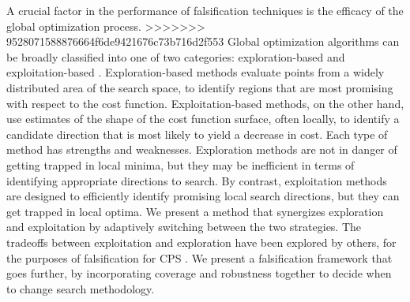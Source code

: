 A crucial factor in the performance of falsification techniques is the efficacy of the global optimization process.
>>>>>>> 9528071588876664f6de9421676c73b716d2f553
Global optimization algorithms can be broadly classified into one of two
categories: exploration-based and exploitation-based \cite{Blum03}.
Exploration-based methods evaluate points from a widely distributed area 
of the search space, to identify regions that are most promising with 
respect to the cost function. Exploitation-based methods, on the other hand, 
use estimates of the shape of the cost function surface, often locally, to
identify a candidate direction that is most likely to yield a decrease
in cost. Each type of method has strengths and weaknesses. Exploration
methods are not in danger of getting trapped in local minima, but they may 
be inefficient in terms of identifying appropriate directions to search.  By
contrast, exploitation methods are designed to efficiently identify
promising local search directions, but they can get trapped in local optima.
We present a method that synergizes exploration and 
exploitation by adaptively switching between the two strategies.
The tradeoffs between exploitation and exploration have been explored by others, 
for the purposes of falsification for CPS \cite{Ratschan14}. We present a falsification framework that goes further, by incorporating coverage and robustness together to decide when to change search methodology.

